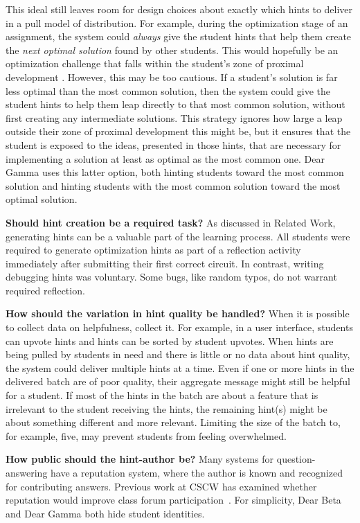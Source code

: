 This ideal still leaves room for design choices about exactly which hints to deliver in a pull model of distribution. For example, during the optimization stage of an assignment, the system could \textit{always} give the student hints that help them create the \textit{next optimal solution} found by other students. This would hopefully be an optimization challenge that falls within the student's zone of proximal development \cite{ZMP}. However, this may be too cautious. If a student's solution is far less optimal than the most common solution, then the system could give the student hints to help them leap directly to that most common solution, without first creating any intermediate solutions. This strategy ignores how large a leap outside their zone of proximal development this might be, but it ensures that the student is exposed to the ideas, presented in those hints, that are necessary for implementing a solution at least as optimal as the most common one. Dear Gamma uses this latter option, both hinting students toward the most common solution and hinting students with the most common solution toward the most optimal solution.

{\bf Should hint creation be a required task?} As discussed in Related Work, generating hints can be a valuable part of the learning process. All students were required to generate optimization hints as part of a reflection activity immediately after submitting their first correct circuit. In contrast, writing debugging hints was voluntary. Some bugs, like random typos, do not warrant required reflection.

{\bf How should the variation in hint quality be handled?} 
When it is possible to collect data on helpfulness, collect it. For example, in a user interface, students can upvote hints and hints can be sorted by student upvotes. When hints are being pulled by students in need and there is little or no data about hint quality, the system could deliver multiple hints at a time. Even if one or more hints in the delivered batch are of poor quality, their aggregate message might still be helpful for a student. If most of the hints in the batch are about a feature that is irrelevant to the student receiving the hints, the remaining hint(s) might be about something different and more relevant. Limiting the size of the batch to, for example, five, may prevent students from feeling overwhelmed.

{\bf How public should the hint-author be?} Many systems for question-answering have a reputation system, where the author is known and recognized for contributing answers. Previous work at CSCW has examined whether reputation would improve class forum participation~\cite{reputation}. For simplicity, Dear Beta and Dear Gamma both hide student identities.

